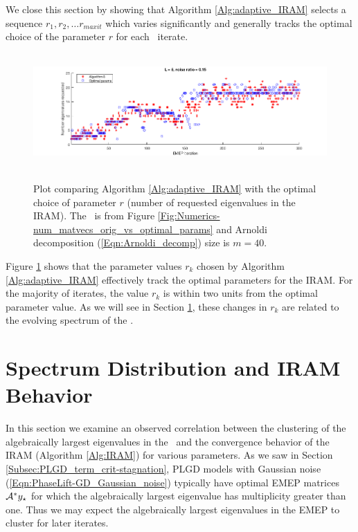 We close this section by showing that Algorithm \ref{Alg:adaptive_IRAM} selects a sequence $r_1, r_2, \ldots r_{maxit}$ which varies significantly and generally tracks the optimal choice of the parameter $r$ for each \emep \ iterate.

\begin{figure}[H]
\centering
\hbox{\hspace{-1.0cm} \includegraphics[scale=0.6]{Numerics-num_eigs_ada_vs_opt_1} }\vspace{0.6cm}
\vspace{0.2cm}
	\caption{
	Plot comparing Algorithm \ref{Alg:adaptive_IRAM} with the optimal choice of parameter $r$ (number of requested eigenvalues in the IRAM).
	 The \emep \ is from Figure \ref{Fig:Numerics-num_matvecs_orig_vs_optimal_params} and Arnoldi decomposition (\ref{Eqn:Arnoldi_decomp}) size is $m=40$.
	}
\label{Fig:Numerics-num_eigs_ada_vs_opt_one_plot}
\end{figure}

Figure \ref{Fig:Numerics-num_eigs_ada_vs_opt_one_plot} shows that the parameter values $r_k$ chosen by Algorithm \ref{Alg:adaptive_IRAM} effectively track the optimal parameters for the IRAM.  
For the majority of iterates, the value $r_k$ is within two units from the optimal parameter value.
As we will see in Section \ref{Subsec:evol_mats-correl_btwn_EMEP_and_IRAM}, these changes in $r_k$ are related to the evolving spectrum of the \emep.




 


\section{Spectrum Distribution and IRAM Behavior}
\label{Subsec:evol_mats-correl_btwn_EMEP_and_IRAM}



In this section we examine an observed correlation between the clustering of the algebraically largest eigenvalues in the \emep \ and the convergence behavior of the IRAM (Algorithm \ref{Alg:IRAM}) for various parameters.
As we saw in Section \ref{Subsec:PLGD_term_crit-stagnation}, PLGD models with Gaussian noise (\ref{Eqn:PhaseLift-GD_Gaussian_noise}) typically have optimal EMEP matrices ${\mathcal A}^*y_\star$ for which the algebraically largest eigenvalue has multiplicity greater than one.
Thus we may expect the algebraically largest eigenvalues in the EMEP to cluster for later iterates.

